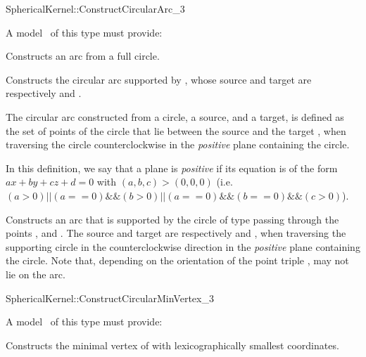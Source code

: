 \begin{ccRefFunctionObjectConcept}{SphericalKernel::ConstructCircularArc_3}

A model \ccVar\ of this type must provide:

{Constructs an arc from a full circle.}

{Constructs the circular arc supported by , whose source and target 
are respectively  and .
}

The circular arc constructed from a circle, a source, and a target, is
defined as the set of points of the circle that lie between the source
 and the target , when traversing the circle
counterclockwise in the \textit{positive} plane containing the circle.

In this definition, we say that a plane is \textit{positive} if its
equation is of the form $ax+by+cz+d=0$ with $(a,b,c)>(0,0,0)$
(i.e. $(a>0) || (a==0) \&\& (b>0) || (a==0)\&\&(b==0)\&\&(c>0)$).

{Constructs an arc that is supported by the circle of type
   passing through the points ,
   and . The source and target are respectively 
  and , when traversing the supporting circle in the
  counterclockwise direction in the \textit{positive} plane containing
  the circle. 
  Note that, depending on the orientation of the point triple
  ,  may not lie on the arc. 
}

\end{ccRefFunctionObjectConcept}
\begin{ccRefFunctionObjectConcept}{SphericalKernel::ConstructCircularMinVertex_3} 


A model \ccVar\ of this type must provide:


{Constructs the minimal vertex of  with lexicographically 
smallest coordinates.}

\end{ccRefFunctionObjectConcept}
